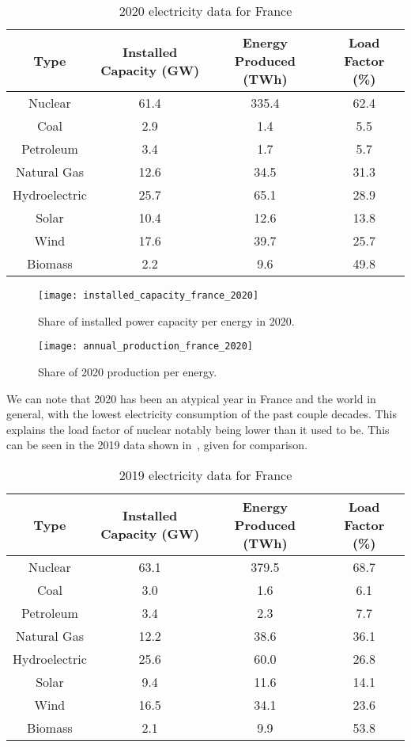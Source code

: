 \begin{table*}[ht]
\caption[2020 electricity data for France]{2020 electricity data for France}
\begin{tabular}{ c c c c }
	\toprule
	Type & Installed Capacity (GW) & Energy Produced (TWh) & Load Factor (\%) \\
	\midrule
	Nuclear & 61.4 & 335.4 & 62.4\\
	Coal & 2.9 & 1.4 & 5.5\\
	Petroleum & 3.4 & 1.7 & 5.7\\
	Natural Gas & 12.6 & 34.5 & 31.3\\
	Hydroelectric & 25.7 & 65.1 & 28.9\\
	Solar & 10.4 & 12.6 & 13.8\\
	Wind & 17.6 & 39.7 & 25.7\\
	Biomass & 2.2 & 9.6 & 49.8\\
	\bottomrule
\end{tabular}
\end{table*}


\begin{figure}[h]
	\texttt{[image: installed\_capacity\_france\_2020]}
	\caption[Share of installed power capacity per energy]{Share of installed power capacity per energy in 2020.}
\end{figure}


\begin{figure}[h]
	\texttt{[image: annual\_production\_france\_2020]}
	\caption[Share of 2020 production per energy]{Share of 2020 production per energy.}
\end{figure}



We can note that 2020 has been an atypical year in France and the world in general, with the lowest electricity consumption of the past couple decades. This explains the load factor of nuclear notably being lower than it used to be. This can be seen in the 2019 data shown in~, given for comparison.

\begin{table*}[ht]
\caption[2019 electricity data for France]{2019 electricity data for France}
\begin{tabular}{ c c c c }
	\toprule
	Type & Installed Capacity (GW) & Energy Produced (TWh) & Load Factor (\%) \\
	\midrule
	Nuclear & 63.1 & 379.5 & 68.7\\
	Coal & 3.0 & 1.6 & 6.1\\
	Petroleum & 3.4 & 2.3 & 7.7\\
	Natural Gas & 12.2 & 38.6 & 36.1\\
	Hydroelectric & 25.6 & 60.0 & 26.8\\
	Solar & 9.4 & 11.6 & 14.1\\
	Wind & 16.5 & 34.1 & 23.6\\
	Biomass & 2.1 & 9.9 & 53.8\\
	\bottomrule
\end{tabular}
\end{table*}


